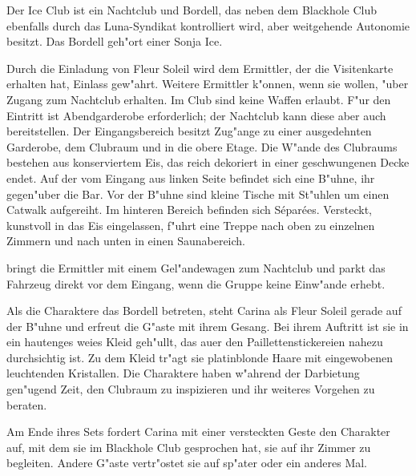 


Der Ice Club ist ein Nachtclub und Bordell, das neben dem Blackhole Club ebenfalls durch das Luna-Syndikat kontrolliert wird, aber weitgehende Autonomie besitzt. Das Bordell geh"ort einer Sonja Ice. 

Durch die Einladung von Fleur Soleil wird dem Ermittler, der die Visitenkarte erhalten hat, Einlass gew"ahrt. Weitere Ermittler k"onnen, wenn sie wollen, "uber \xl{} Zugang zum Nachtclub erhalten. Im Club sind keine Waffen erlaubt. F"ur den Eintritt ist Abendgarderobe erforderlich; der Nachtclub kann diese aber auch bereitstellen. Der Eingangsbereich besitzt Zug"ange zu einer ausgedehnten Garderobe, dem Clubraum und in die obere Etage. Die W"ande des Clubraums bestehen aus konserviertem Eis, das reich dekoriert in einer geschwungenen Decke endet. Auf der vom Eingang aus linken Seite befindet sich eine B"uhne, ihr gegen"uber die Bar. Vor der B"uhne sind kleine Tische mit St"uhlen um einen Catwalk aufgereiht. Im hinteren Bereich befinden sich S\'epar\'ees. Versteckt, kunstvoll in das Eis eingelassen, f"uhrt eine Treppe nach oben zu einzelnen Zimmern und nach unten in einen Saunabereich.

\xl{} bringt die Ermittler mit einem Gel"andewagen zum Nachtclub und parkt das Fahrzeug direkt vor dem Eingang, wenn die Gruppe keine Einw"ande erhebt.

Als die Charaktere das Bordell betreten, steht Carina als Fleur Soleil gerade auf der B"uhne und erfreut die G"aste mit ihrem Gesang. Bei ihrem Auftritt ist sie in ein hautenges wei\3es Kleid geh"ullt, das au\3er den Paillettenstickereien nahezu durchsichtig ist. Zu dem Kleid tr"agt sie platinblonde Haare mit eingewobenen leuchtenden Kristallen. Die Charaktere haben w"ahrend der Darbietung gen"ugend Zeit, den Clubraum zu inspizieren und ihr weiteres Vorgehen zu beraten.

Am Ende ihres Sets fordert Carina mit einer versteckten Geste den Charakter auf, mit dem sie im Blackhole Club gesprochen hat, sie auf ihr Zimmer zu begleiten. Andere G"aste vertr"ostet sie auf sp"ater oder ein anderes Mal.

